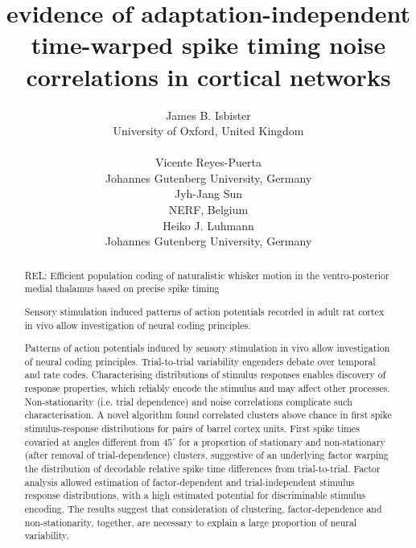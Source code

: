 \documentclass{article}
\title{evidence of adaptation-independent time-warped spike timing noise correlations in cortical networks}
\author{
  James B. Isbister\\
  University of Oxford, United Kingdom
  \And
              \\
              \\
  \And
  Vicente Reyes-Puerta\\
  Johannes Gutenberg University, Germany
  

  \And
  Jyh-Jang Sun\\
  NERF, Belgium

  \And
  Heiko J. Luhmann\\
  Johannes Gutenberg University, Germany


}
\begin{document}
\maketitle
 
\begin{abstract}

REL: Efficient population coding of naturalistic whisker motion in the ventro-posterior medial thalamus based on precise spike timing

Sensory stimulation induced patterns of action potentials recorded in adult rat cortex in vivo allow investigation of neural coding principles. 

Patterns of action potentials induced by sensory stimulation in vivo allow investigation of neural coding principles. Trial-to-trial variability engenders debate over temporal and rate codes. Characterising distributions of stimulus responses enables discovery of response properties, which reliably encode the stimulus and may affect other processes. Non-stationarity (i.e. trial dependence) and noise correlations complicate such characterisation. A novel algorithm found correlated clusters above chance in first spike stimulus-response distributions for pairs of barrel cortex units. First spike times covaried at angles different from $45^{\circ}$ for a proportion of stationary and non-stationary (after removal of trial-dependence) clusters, suggestive of an underlying factor warping the distribution of decodable relative spike time differences from trial-to-trial. Factor analysis allowed estimation of factor-dependent and trial-independent stimulus response distributions, with a high estimated potential for discriminable stimulus encoding. The results suggest that consideration of clustering, factor-dependence and non-stationarity, together, are necessary to explain a large proportion of neural variability.


\end{abstract}


\end{document}
